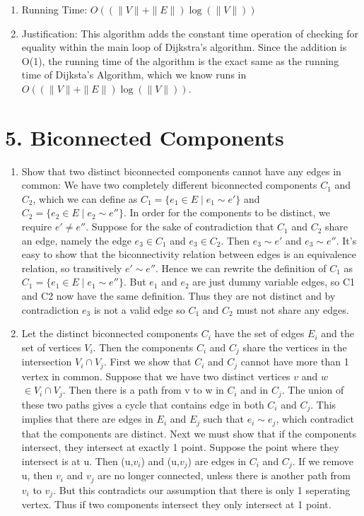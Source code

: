\documentclass[11pt]{article}
\newenvironment{qparts}{\begin{enumerate}[{(}a{)}]}{\end{enumerate}}
\begin{document}
\begin{enumerate}
\item Running Time: $O((\|V\|+\|E\|)\log (\|V\|))$
\item Justification: This algorithm adds the constant time operation of checking for equality within the main loop of Dijkstra's algorithm. Since the addition is O(1), the running time of the algorithm is the exact same as the running time of Dijksta's Algorithm, which we know runs in $O((\|V\|+\|E\|)\log (\|V\|))$.
\end{enumerate}

\newpage
\section*{5. Biconnected Components}
\begin{qparts}
\item Show that two distinct biconnected components cannot have any edges in common: We have two completely different biconnected components $C_1$ and $C_2$, which we can define as $C_1 = \{e_1 \in E \mid e_1 \sim e'\}$ and $C_2 = \{e_2 \in E \mid e_2 \sim e''\}$. In order for the components to be distinct, we require $e' \neq e''$. Suppose for the sake of contradiction that $C_1$ and $C_2$ share an edge, namely the edge $e_3 \in C_1$ and $e_3 \in C_2$. Then $e_3 \sim e'$ and $e_3 \sim e''$. It's easy to show that the biconnectivity relation between edges is an equivalence relation, so transitively $e' \sim e''$. Hence we can rewrite the definition of $C_1$ as $C_1 = \{e_1 \in E \mid e_1 \sim e''\}$. But $e_1$ and $e_2$ are just dummy variable edges, so C1 and C2 now have the same definition. Thus they are not distinct and by contradiction $e_3$ is not a valid edge so $C_1$ and $C_2$ must not share any edges.
\item Let the distinct biconnected components $C_i$ have the set of edges $E_i$ and the set of vertices $V_i$. Then the components $C_i$ and $C_j$ share the vertices in the intersection $V_i \cap V_j$. First we show that $C_i$ and $C_j$ cannot have more than 1 vertex in common. Suppose that we have two distinct vertices $v$ and $w$ $\in V_i \cap V_j$. Then there is a path from v to w in $C_i$ and in $C_j$. The union of these two paths gives a cycle that contains edge in both $C_i$ and $C_j$. This implies that there are edges in $E_i$ and $E_j$ such that $e_i \sim e_j$, which contradict that the components are distinct.
Next we must show that if the components intersect, they intersect at exactly 1 point. Suppose the point where they intersect is at u. Then (u,$v_i$) and (u,$v_j$) are edges in $C_i$ and $C_j$. If we remove u, then $v_i$ and $v_j$ are no longer connected, unless there is another path from $v_i$ to $v_j$. But this contradicts our assumption that there is only 1 seperating vertex. Thus if two components intersect they only intersect at 1 point.

\end{qparts}
\end{document}
